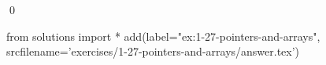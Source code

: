 
\begin{ex}
  \label{ex:1-27-pointers-and-arrays}
  
  \qed
\end{ex}
\begin{python0}
from solutions import *
add(label="ex:1-27-pointers-and-arrays",
    srcfilename='exercises/1-27-pointers-and-arrays/answer.tex')
\end{python0}
